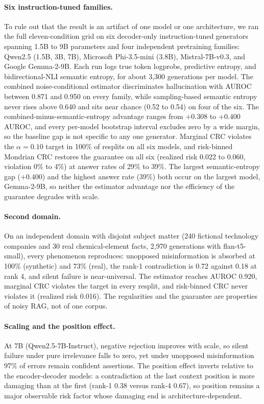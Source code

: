 \documentclass[sn-basic]{sn-jnl}
\theoremstyle{thmstyleone}
\theoremstyle{thmstyletwo}
\begin{document}
\paragraph{Six instruction-tuned families.}
To rule out that the result is an artifact of one model or one
architecture, we ran the full eleven-condition grid on six decoder-only
instruction-tuned generators spanning 1.5B to 9B parameters and four
independent pretraining families: Qwen2.5 (1.5B, 3B, 7B), Microsoft
Phi-3.5-mini (3.8B), Mistral-7B-v0.3, and Google Gemma-2-9B. Each run
logs true token logprobs, predictive entropy, and bidirectional-NLI
semantic entropy, for about 3{,}300 generations per model. The combined
noise-conditional estimator discriminates hallucination with AUROC
between 0.871 and 0.950 on every family, while sampling-based semantic
entropy never rises above 0.640 and sits near chance (0.52 to 0.54) on
four of the six. The combined-minus-semantic-entropy advantage ranges
from $+0.308$ to $+0.400$ AUROC, and every per-model bootstrap interval
excludes zero by a wide margin, so the baseline gap is not specific to
any one generator. Marginal CRC violates the $\alpha = 0.10$ target in
100\% of resplits on all six models, and risk-binned Mondrian CRC
restores the guarantee on all six (realized risk 0.022 to 0.060,
violation 0\% to 4\%) at answer rates of 29\% to 39\%. The largest
semantic-entropy gap ($+0.400$) and the highest answer rate (39\%) both
occur on the largest model, Gemma-2-9B, so neither the estimator
advantage nor the efficiency of the guarantee degrades with scale.

\paragraph{Second domain.}
On an independent domain with disjoint subject matter (240 fictional technology
companies and 30 real chemical-element facts, 2{,}970 generations with
flan-t5-small), every phenomenon reproduces: unopposed misinformation is
absorbed at 100\% (synthetic) and 73\% (real), the rank-1 contradiction is 0.72
against 0.18 at rank 4, and silent failure is near-universal. The estimator
reaches AUROC 0.920, marginal CRC violates the target in every resplit, and
risk-binned CRC never violates it (realized risk 0.016). The regularities and
the guarantee are properties of noisy RAG, not of one corpus.

\paragraph{Scaling and the position effect.}
At 7B (Qwen2.5-7B-Instruct), negative rejection improves with scale, so silent
failure under pure irrelevance falls to zero, yet under unopposed misinformation
97\% of errors remain confident assertions. The position effect inverts relative
to the encoder-decoder models: a contradiction at the last context position is
more damaging than at the first (rank-1 0.38 versus rank-4 0.67), so position
remains a major observable risk factor whose damaging end is
architecture-dependent.
\end{document}
